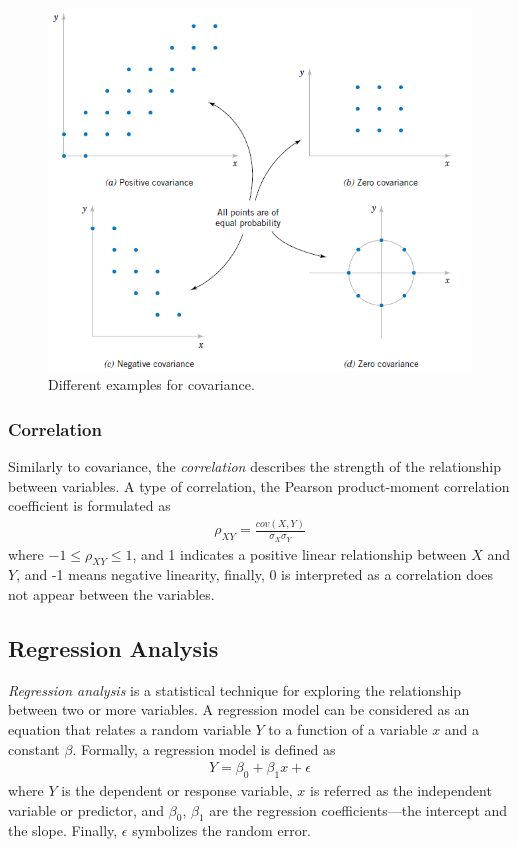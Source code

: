 \begin{figure}[!ht]
	\centering
	\includegraphics[width=140mm, keepaspectratio]{figures/covariance.png}
	\caption{Different examples for covariance.}
	\label{fig:covariance}
\end{figure}

\subsubsection{Correlation}
Similarly to covariance, the \textit{correlation} describes the strength of the relationship between variables. A type of correlation, the Pearson product-moment correlation coefficient is formulated as
\begin{align}
	\rho_{XY} = \frac{cov(X, Y)}{\sigma_X\sigma_Y}
\end{align}
where $ -1 \leq \rho_{XY} \leq 1$, and 1 indicates a positive linear relationship between $X$ and $Y$, and -1 means negative linearity, finally, 0 is interpreted as a correlation does not appear between the variables.

\subsection{Regression Analysis}

\textit{Regression analysis} is a statistical technique for exploring the relationship between two or more variables. A regression model can be considered as an equation that relates a random variable $Y$ to a function of a variable $x$ and a constant $\beta$. Formally, a regression model is defined as
\begin{align} \label{eq:linear_regression}
	Y = \beta_0 + \beta_1x + \epsilon
\end{align}
where $Y$ is the dependent or response variable, $x$ is referred as the independent variable or predictor, and $\beta_0$, $\beta_1$ are the regression coefficients---the intercept and the slope. Finally, $\epsilon$ symbolizes the random error.

